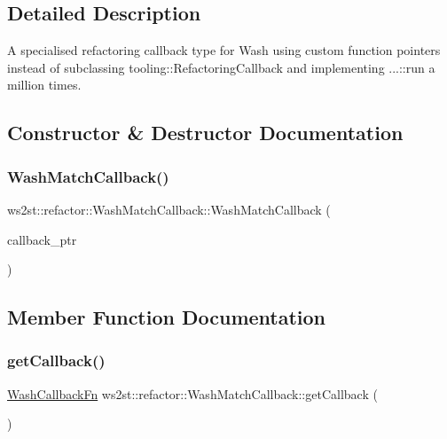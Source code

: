 \subsection{Detailed Description}
A specialised refactoring callback type for Wash using custom function pointers instead of subclassing tooling\+::\+Refactoring\+Callback and implementing ...\+::run a million times. 

\subsection{Constructor \& Destructor Documentation}
\mbox{\label{classws2st_1_1refactor_1_1WashMatchCallback_a92cc5cf8562d6d0df12547a5df116bec}} 
\subsubsection{\texorpdfstring{Wash\+Match\+Callback()}{WashMatchCallback()}}
{\footnotesize\ttfamily ws2st\+::refactor\+::\+Wash\+Match\+Callback\+::\+Wash\+Match\+Callback (\begin{DoxyParamCaption}\item[{\mbox{\hyperlink{namespacews2st_a682dfda40d8282c7e579a7b826a7d861}{Wash\+Callback\+Fn}}}]{callback\+\_\+ptr }\end{DoxyParamCaption})\hspace{0.3cm}{\ttfamily [inline]}}



\subsection{Member Function Documentation}
\mbox{\label{classws2st_1_1refactor_1_1WashMatchCallback_a91f255d66c7a62daa588b7f6910b5b50}} 
\subsubsection{\texorpdfstring{get\+Callback()}{getCallback()}}
{\footnotesize\ttfamily \mbox{\hyperlink{namespacews2st_a682dfda40d8282c7e579a7b826a7d861}{Wash\+Callback\+Fn}} ws2st\+::refactor\+::\+Wash\+Match\+Callback\+::get\+Callback (\begin{DoxyParamCaption}{ }\end{DoxyParamCaption})\hspace{0.3cm}{\ttfamily [inline]}}

